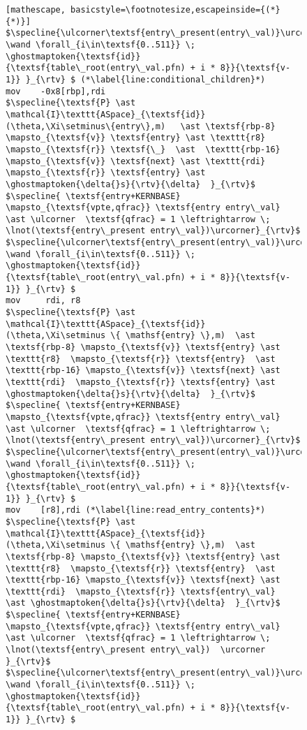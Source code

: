 \begin{figure}
\begin{lstlisting}[mathescape, basicstyle=\footnotesize,escapeinside={(*}{*)}]
$\specline{\ulcorner\textsf{entry\_present(entry\_val)}\urcorner \wand \forall_{i\in\textsf{0..511}} \; \ghostmaptoken{\textsf{id}}{\textsf{table\_root(entry\_val.pfn) + i * 8}}{\textsf{v-1}} }_{\rtv} $ (*\label{line:conditional_children}*)
mov    -0x8[rbp],rdi
$\specline{\textsf{P} \ast \mathcal{I}\texttt{ASpace}_{\textsf{id}}(\theta,\Xi\setminus\{entry\},m)   \ast \textsf{rbp-8} \mapsto_{\textsf{v}} \textsf{entry} \ast \texttt{r8}  \mapsto_{\textsf{r}} \textsf{\_}  \ast  \texttt{rbp-16} \mapsto_{\textsf{v}} \textsf{next} \ast \texttt{rdi}  \mapsto_{\textsf{r}} \textsf{entry} \ast \ghostmaptoken{\delta{}s}{\rtv}{\delta}  }_{\rtv}$
$\specline{ \textsf{entry+KERNBASE} \mapsto_{\textsf{vpte,qfrac}} \textsf{entry entry\_val} \ast \ulcorner  \textsf{qfrac} = 1 \leftrightarrow \; \lnot(\textsf{entry\_present entry\_val})\urcorner}_{\rtv}$
$\specline{\ulcorner\textsf{entry\_present(entry\_val)}\urcorner \wand \forall_{i\in\textsf{0..511}} \; \ghostmaptoken{\textsf{id}}{\textsf{table\_root(entry\_val.pfn) + i * 8}}{\textsf{v-1}} }_{\rtv} $
mov     rdi, r8
$\specline{\textsf{P} \ast \mathcal{I}\texttt{ASpace}_{\textsf{id}}(\theta,\Xi\setminus \{ \mathsf{entry} \},m)  \ast \textsf{rbp-8} \mapsto_{\textsf{v}} \textsf{entry} \ast \texttt{r8}  \mapsto_{\textsf{r}} \textsf{entry}  \ast  \texttt{rbp-16} \mapsto_{\textsf{v}} \textsf{next} \ast \texttt{rdi}  \mapsto_{\textsf{r}} \textsf{entry} \ast \ghostmaptoken{\delta{}s}{\rtv}{\delta}  }_{\rtv}$
$\specline{ \textsf{entry+KERNBASE} \mapsto_{\textsf{vpte,qfrac}} \textsf{entry entry\_val} \ast \ulcorner  \textsf{qfrac} = 1 \leftrightarrow \; \lnot(\textsf{entry\_present entry\_val})\urcorner}_{\rtv}$
$\specline{\ulcorner\textsf{entry\_present(entry\_val)}\urcorner \wand \forall_{i\in\textsf{0..511}} \; \ghostmaptoken{\textsf{id}}{\textsf{table\_root(entry\_val.pfn) + i * 8}}{\textsf{v-1}} }_{\rtv} $
mov    [r8],rdi (*\label{line:read_entry_contents}*)
$\specline{\textsf{P} \ast \mathcal{I}\texttt{ASpace}_{\textsf{id}}(\theta,\Xi\setminus \{ \mathsf{entry} \},m)  \ast \textsf{rbp-8} \mapsto_{\textsf{v}} \textsf{entry} \ast \texttt{r8}  \mapsto_{\textsf{r}} \textsf{entry}  \ast  \texttt{rbp-16} \mapsto_{\textsf{v}} \textsf{next} \ast \texttt{rdi}  \mapsto_{\textsf{r}} \textsf{entry\_val}  \ast \ghostmaptoken{\delta{}s}{\rtv}{\delta}  }_{\rtv}$
$\specline{ \textsf{entry+KERNBASE} \mapsto_{\textsf{vpte,qfrac}} \textsf{entry entry\_val} \ast \ulcorner  \textsf{qfrac} = 1 \leftrightarrow \; \lnot(\textsf{entry\_present entry\_val})  \urcorner }_{\rtv}$
$\specline{\ulcorner\textsf{entry\_present(entry\_val)}\urcorner \wand \forall_{i\in\textsf{0..511}} \; \ghostmaptoken{\textsf{id}}{\textsf{table\_root(entry\_val.pfn) + i * 8}}{\textsf{v-1}} }_{\rtv} $

\end{lstlisting}
\end{figure}
